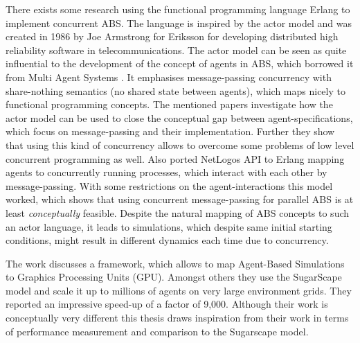 There exists some research \cite{di_stefano_using_2005, varela_modelling_2004, sher_agent-based_2013} using the functional programming language Erlang \cite{armstrong_erlang_2010} to implement concurrent ABS. The language is inspired by the actor model \cite{agha_actors:_1986} and was created in 1986 by Joe Armstrong for Eriksson for developing distributed high reliability software in telecommunications. The actor model can be seen as quite influential to the development of the concept of agents in ABS, which borrowed it from Multi Agent Systems \cite{wooldridge_introduction_2009}. It emphasises message-passing concurrency with share-nothing semantics (no shared state between agents), which maps nicely to functional programming concepts. The mentioned papers investigate how the actor model can be used to close the conceptual gap between agent-specifications, which focus on message-passing and their implementation. Further they show that using this kind of concurrency allows to overcome some problems of low level concurrent programming as well.
Also \cite{bezirgiannis_improving_2013} ported NetLogos API to Erlang mapping agents to concurrently running processes, which interact with each other by message-passing. With some restrictions on the agent-interactions this model worked, which shows that using concurrent message-passing for parallel ABS is at least \textit{conceptually} feasible. Despite the natural mapping of ABS concepts to such an actor language, it leads to simulations, which despite same initial starting conditions, might result in different dynamics each time due to concurrency.

The work \cite{lysenko_framework_2008} discusses a framework, which allows to map Agent-Based Simulations to Graphics Processing Units (GPU). Amongst others they use the SugarScape model \cite{epstein_growing_1996} and scale it up to millions of agents on very large environment grids. They reported an impressive speed-up of a factor of 9,000. Although their work is conceptually very different this thesis draws inspiration from their work in terms of performance measurement and comparison to the Sugarscape model.


